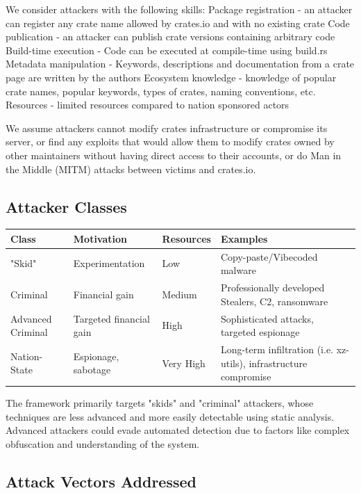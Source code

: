 We consider attackers with the following skills:
Package registration - an attacker can register any crate name allowed by crates.io and with no existing crate
Code publication - an attacker can publish crate versions containing arbitrary code
Build-time execution - Code can be executed at compile-time using build.rs
Metadata manipulation - Keywords, descriptions and documentation from a crate page are written by the authors
Ecosystem knowledge - knowledge of popular crate names, popular keywords, types of crates, naming conventions, etc.
Resources - limited resources compared to nation sponsored actors

We assume attackers cannot modify crates infrastructure or compromise its server, or find any exploits that would allow them to modify crates owned by other maintainers without having direct access to their accounts, or do Man in the Middle (MITM) attacks between victims and crates.io.

\subsection{Attacker Classes}\label{subsect:attacker-classes}


\begin{tabular}{|l|l|l|p{6cm}|}
\hline
\textbf{Class} & \textbf{Motivation} & \textbf{Resources} & \textbf{Examples} \\
\hline
"Skid" & Experimentation & Low & Copy-paste/Vibecoded malware \\
\hline
Criminal & Financial gain & Medium & Professionally developed Stealers, C2, ransomware \\
\hline
Advanced Criminal & Targeted financial gain & High & Sophisticated attacks, targeted espionage \\
\hline
Nation-State & Espionage, sabotage & Very High & Long-term infiltration (i.e. xz-utils), infrastructure compromise \\
\hline
\end{tabular}

The framework primarily targets "skids" and "criminal" attackers, whose techniques are less advanced and more easily detectable using static analysis. Advanced attackers could evade automated detection due to factors like complex obfuscation and understanding of the system.


\subsection{Attack Vectors Addressed}\label{subsect:attack-vectors}

